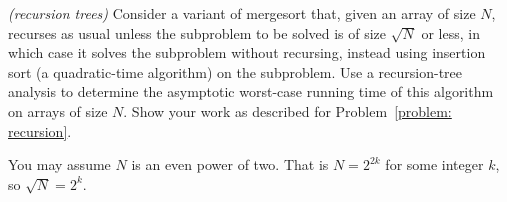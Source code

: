 \documentclass[11pt]{article}
\renewcommand{\inputAnswer}[1]{}
\begin{document}



\newpage

{\small
\problem\label{problem: mergesort}\emph{(recursion trees)}
Consider a variant of \textsf{mergesort} that, given an array of size $N$,
recurses as usual unless the subproblem to be solved is of size $\sqrt N$ or less,
in which case it solves the subproblem without recursing, instead using insertion sort
(a quadratic-time algorithm) on the subproblem.
Use a recursion-tree analysis to determine
the asymptotic worst-case running time of this algorithm on arrays of size $N$.
Show your work as described for Problem~\ref{problem: recursion}.

You may assume $N$ is an even power of two.  That is $N=2^{2k}$ for some integer $k$,
so $\sqrt N = 2^k$.
}

\setlength{\ITEMHT}{1.15in}
{
\injectEnumerate 

\inputAnswer{problem_4_answer}
}




\newpage
\end{document}
